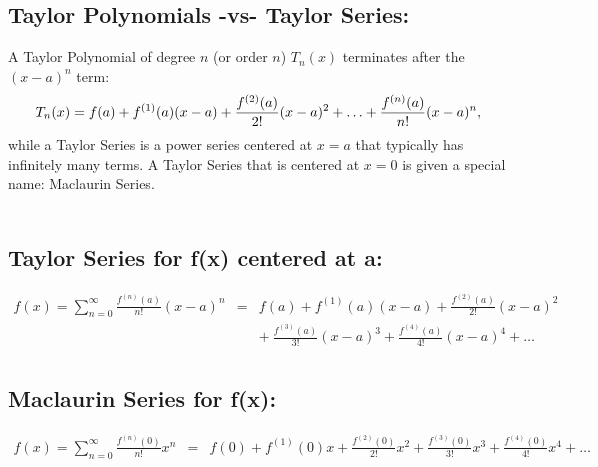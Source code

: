 \vspace*{.1in}

\subsection*{Taylor Polynomials -vs- Taylor Series:}
 A Taylor Polynomial of degree \(n\) (or order \(n\)) \(T_n(x)\) terminates after the \((x-a)^n\) term:
\[
T_n(x) = f(a) + f^{(1)}(a)(x-a) + \frac{f^{(2)}(a)}{2!}(x-a)^2+\ldots+\frac{f^{(n)}(a)}{n!}(x-a)^n,\\
\]
while a Taylor Series is a power series centered at \(x=a\) that typically has infinitely many terms. A Taylor Series that is centered at \(x=0\) is given a special name: Maclaurin Series.\\~\\

\vspace*{.1in}

\subsection*{ Taylor Series for f(x) centered at a:}
\vspace*{-.1in}
\begin{eqnarray*}
f(x) = \sum_{n=0}^\infty \frac{f^{(n)}(a)}{n!}(x-a)^n &=& f(a) + f^{(1)}(a)(x-a) + \frac{f^{(2)}(a)}{2!}(x-a)^2\\
&& +\ \frac{f^{(3)}(a)}{3!}(x-a)^3+\frac{f^{(4)}(a)}{4!}(x-a)^4+\ldots\\
\end{eqnarray*}

\vspace*{.1in}


\subsection*{Maclaurin Series for f(x):}
\vspace*{-.1in}
\begin{eqnarray*}
f(x) = \sum_{n=0}^\infty \frac{f^{(n)}(0)}{n!}x^n &=& f(0) + f^{(1)}(0)x 
+ \frac{f^{(2)}(0)}{2!}x^2 + \frac{f^{(3)}(0)}{3!}x^3+\frac{f^{(4)}(0)}{4!}x^4+\ldots\\
\end{eqnarray*}
 
\vspace*{.1in}

